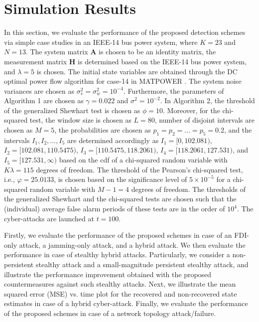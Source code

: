 \documentclass[onecolumn]{IEEEtran}
\begin{document}
\section{Simulation Results} \label{sec:numerical}


In this section, we evaluate the performance of the proposed detection schemes via simple case studies in an IEEE-14 bus power system, where $K = 23$ and $N = 13$. The system matrix $\mathbf{A}$ is chosen to be an identity matrix, the measurement matrix $\mathbf{H}$ is determined based on the IEEE-14 bus power system, and $\lambda = 5$ is chosen. The initial state variables are obtained through the DC optimal power flow algorithm for case-14 in MATPOWER \cite{Zimmerman11}. The system noise variances are chosen as $\sigma_v^2 = \sigma_w^2 = 10^{-4}$. Furthermore, the parameters of Algorithm 1 are chosen as $\gamma = 0.022$ and $\sigma^2 = 10^{-2}$. In Algorithm 2, the threshold of the generalized Shewhart test is chosen as $\phi = 10$. Moreover, for the chi-squared test, the window size is chosen as $L = 80$, number of disjoint intervals are chosen as $M = 5$, the probabilities are chosen as $p_1=p_2=\dots=p_5 = 0.2$, and the intervals $I_1, I_2, \dots, I_5$ are determined accordingly as $I_1 = [0,102.081)$, $I_2 = [102.081,110.5475)$, $I_3 = [110.5475,118.2061)$, $I_4 = [118.2061,127.531)$, and $I_5 = [127.531,\infty)$ based on the cdf of a chi-squared random variable with $K \lambda = 115$ degrees of freedom. The threshold of the Pearson's chi-squared test, i.e., $\varphi = 25.0133$, is chosen based on the significance level of $5 \times 10^{-5}$ for a chi-squared random variable with $M-1 = 4$ degrees of freedom. The thresholds of the generalized Shewhart and the chi-squared tests are chosen such that the (individual) average false alarm periods of these tests are in the order of $10^4$. The cyber-attacks are launched at $t = 100$.

Firstly, we evaluate the performance of the proposed schemes in case of an FDI-only attack, a jamming-only attack, and a hybrid attack. We then evaluate the performance in case of stealthy hybrid attacks. Particularly, we consider a non-persistent stealthy attack and a small-magnitude persistent stealthy attack, and illustrate the performance improvement obtained with the proposed countermeasures against such stealthy attacks. Next, we illustrate the mean squared error (MSE) vs. time plot for the recovered and non-recovered state estimates in case of a hybrid cyber-attack.  {Finally, we evaluate the performance of the proposed schemes in case of a network topology attack/failure.}
\end{document}
